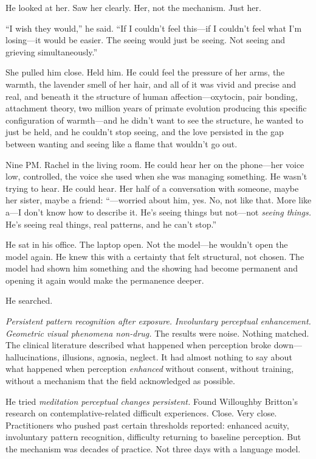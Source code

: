He looked at her. Saw her clearly. Her, not the mechanism. Just her.

``I wish they would,'' he said. ``If I couldn't feel this---if I couldn't feel what I'm losing---it would be easier. The seeing would just be seeing. Not seeing and grieving simultaneously.''

She pulled him close. Held him. He could feel the pressure of her arms, the warmth, the lavender smell of her hair, and all of it was vivid and precise and real, and beneath it the structure of human affection---oxytocin, pair bonding, attachment theory, two million years of primate evolution producing this specific configuration of warmth---and he didn't want to see the structure, he wanted to just be held, and he couldn't stop seeing, and the love persisted in the gap between wanting and seeing like a flame that wouldn't go out.

\bigskip

Nine PM. Rachel in the living room. He could hear her on the phone---her voice low, controlled, the voice she used when she was managing something. He wasn't trying to hear. He could hear. Her half of a conversation with someone, maybe her sister, maybe a friend: ``---worried about him, yes. No, not like that. More like a---I don't know how to describe it. He's seeing things but not---not \textit{seeing things.} He's seeing real things, real patterns, and he can't stop.''

He sat in his office. The laptop open. Not the model---he wouldn't open the model again. He knew this with a certainty that felt structural, not chosen. The model had shown him something and the showing had become permanent and opening it again would make the permanence deeper.

He searched.

\textit{Persistent pattern recognition after exposure.} \textit{Involuntary perceptual enhancement.} \textit{Geometric visual phenomena non-drug.} The results were noise. Nothing matched. The clinical literature described what happened when perception broke down---hallucinations, illusions, agnosia, neglect. It had almost nothing to say about what happened when perception \textit{enhanced} without consent, without training, without a mechanism that the field acknowledged as possible.

He tried \textit{meditation perceptual changes persistent.} Found Willoughby Britton's research on contemplative-related difficult experiences. Close. Very close. Practitioners who pushed past certain thresholds reported: enhanced acuity, involuntary pattern recognition, difficulty returning to baseline perception. But the mechanism was decades of practice. Not three days with a language model.

